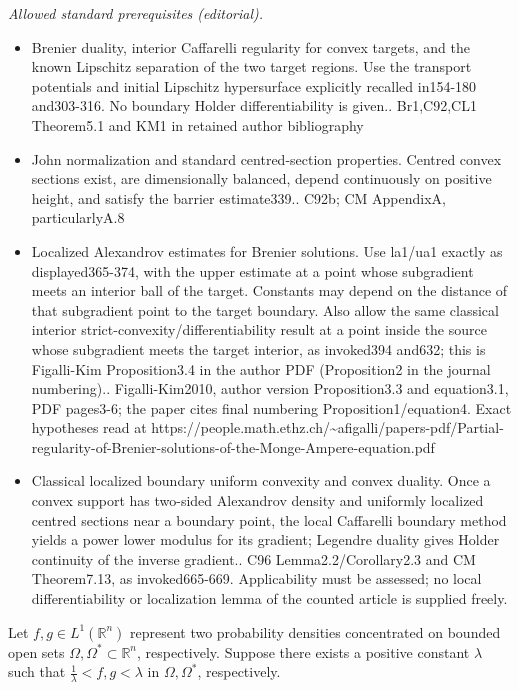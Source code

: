 \documentclass[10pt,a4paper]{amsart}
\theoremstyle{plain}
\newcommand{\0}{\textbf{0}}
\numberwithin{equation}{section}
\numberwithin{equation}{section}
\numberwithin{figure}{section}
\begin{document}
\noindent\textit{Allowed standard prerequisites (editorial).}\begin{itemize}
\item Brenier duality, interior Caffarelli regularity for convex targets, and the known Lipschitz separation of the two target regions. Use the transport potentials and initial Lipschitz hypersurface explicitly recalled in154-180 and303-316. No boundary Holder differentiability is given.. Br1,C92,CL1 Theorem5.1 and KM1 in retained author bibliography
\item John normalization and standard centred-section properties. Centred convex sections exist, are dimensionally balanced, depend continuously on positive height, and satisfy the barrier estimate339.. C92b; CM AppendixA, particularlyA.8
\item Localized Alexandrov estimates for Brenier solutions. Use la1/ua1 exactly as displayed365-374, with the upper estimate at a point whose subgradient meets an interior ball of the target. Constants may depend on the distance of that subgradient point to the target boundary. Also allow the same classical interior strict-convexity/differentiability result at a point inside the source whose subgradient meets the target interior, as invoked394 and632; this is Figalli-Kim Proposition3.4 in the author PDF (Proposition2 in the journal numbering).. Figalli-Kim2010, author version Proposition3.3 and equation3.1, PDF pages3-6; the paper cites final numbering Proposition1/equation4. Exact hypotheses read at https://people.math.ethz.ch/\textasciitilde{}afigalli/papers-pdf/Partial-regularity-of-Brenier-solutions-of-the-Monge-Ampere-equation.pdf
\item Classical localized boundary uniform convexity and convex duality. Once a convex support has two-sided Alexandrov density and uniformly localized centred sections near a boundary point, the local Caffarelli boundary method yields a power lower modulus for its gradient; Legendre duality gives Holder continuity of the inverse gradient.. C96 Lemma2.2/Corollary2.3 and CM Theorem7.13, as invoked665-669. Applicability must be assessed; no local differentiability or localization lemma of the counted article is supplied freely.
\end{itemize}\medskip
Let $f, g \in L^1(\mathbb{R}^n)$ represent two probability densities concentrated on bounded open sets $\Omega, \Omega^*\subset\mathbb{R}^n$, respectively. Suppose there exists a positive constant \(\lambda\) such that $\frac{1}{\lambda} < f, g < \lambda$ in $\Omega, \Omega^*$, respectively.
\end{document}
